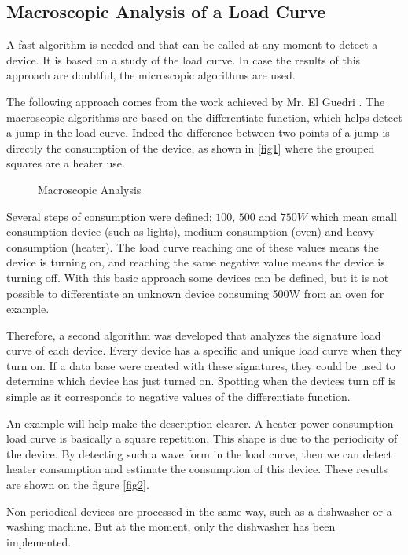 \subsection{Macroscopic Analysis of a Load Curve}
A fast algorithm is needed and that can be called at any moment to detect a device. It is based on a study of the load curve. In case the results of this approach are doubtful, the microscopic algorithms are used.

The following approach comes from the work achieved by Mr. El Guedri \cite{research1}. The macroscopic algorithms are based on the differentiate function, which helps detect a jump in the load curve. Indeed the difference between two points of a jump is directly the consumption of the device, as shown in \ref{fig1} where the grouped squares are a heater use.


\begin{figure}[h]
 \begin{center}
   \caption{Macroscopic Analysis}
   \label{fig-1-1-2}
 \end{center}
\end{figure}

Several steps of consumption were defined: $100$, $500$ and $750W$ which mean small consumption device (such as lights), medium consumption (oven) and heavy consumption (heater). The load curve reaching one of these values means the device is turning on, and reaching the same negative value means the device is turning off. With this basic approach some devices can be defined, but it is not possible to differentiate an unknown device consuming 500W from an oven for example.

Therefore, a second algorithm was developed that analyzes the signature load curve of each device. Every device has a specific and unique load curve when they turn on. If a data base were created with these signatures, they could be used to determine which device has just turned on. Spotting when the devices turn off is simple as it corresponds to negative values of the differentiate function.

An example will help make the description clearer. A heater power consumption load curve is basically a square repetition. This shape is due to the periodicity of the device. By detecting such a wave form in the load curve, then we can detect heater consumption and estimate the consumption of this device. These results are shown on the figure \ref{fig2}.


Non periodical devices are processed in the same way, such as a dishwasher or a washing machine. But at the moment, only the dishwasher has been implemented.

